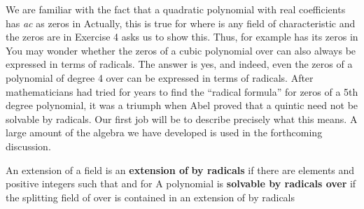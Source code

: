 \documentclass[11pt,oneside]{article}
\begin{document}
\fi
\renewcommand{\BookFooter}{Section 49 Insolvability of the Quintic}
\ifdefined\BookMaster\else\setcounter{page}{384}\fi
\BookNarrativetrue

\begin{BookBody}



\noindent We are familiar with the fact that a quadratic polynomial  with real coefficients has \textit{ac} as zeros in  Actually, this is true for  where  is any field of characteristic and the zeros are in  Exercise 4 asks us to show this. Thus, for example has its zeros in  You may wonder whether the zeros of a cubic polynomial over  can also always be expressed in terms of radicals. The answer is yes, and indeed, even the zeros of a polynomial of degree 4 over  can be expressed in terms of radicals. After mathematicians had tried for years to find the “radical formula” for zeros of a 5th degree polynomial, it was a triumph when Abel proved that a quintic need not be solvable by radicals. Our first job will be to describe precisely what this means. A large amount of the algebra we have developed is used in the forthcoming discussion.


 An extension  of a field  is an\textbf{ extension of}  \textbf{by radicals} if there are elements  and positive integers  such that  and  for  A polynomial  is\textbf{ solvable by rad}\textbf{icals over}  if the splitting field  of  over  is contained in an extension of  by radicals\BookEnd{\blacksquare}


\end{BookBody}
\end{document}
